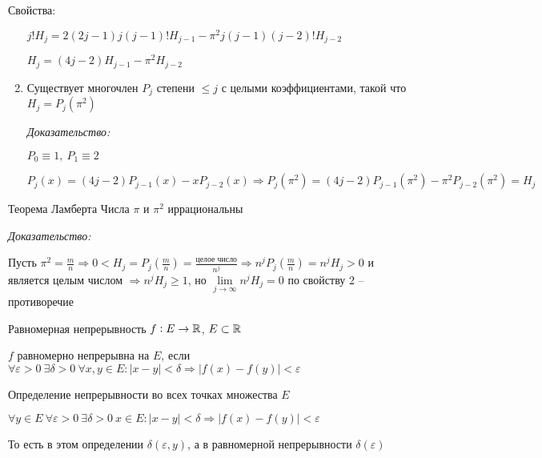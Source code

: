 \documentclass[12pt]{article}
\begin{document}
\begin{Example}{}
\begin{theo}{Свойства:}
\begin{enumerate}
            $j!H_j = 2(2j - 1)j(j - 1)!H_{j - 1} - \pi^2j(j - 1)(j - 2)!H_{j - 2}$

            $H_j = (4j - 2)H_{j - 1} - \pi^2H_{j - 2}$

            \item Существует многочлен $P_j$ степени $\leq j$ с целыми коэффициентами, такой что $H_j = P_j(\pi^2)$
            
            \textit{Доказательство:}

            $P_0 \equiv 1,\ P_1 \equiv 2$

            $P_j(x) = (4j - 2)P_{j - 1}(x) - xP_{j - 2}(x) \Rightarrow P_j(\pi^2) = (4j - 2)P_{j - 1}(\pi^2) - \pi^2P_{j - 2}(\pi^2) = H_j$
        \end{enumerate}
    \end{theo}
\end{Example}

\begin{theo}{Теорема Ламберта}
    Числа $\pi$ и $\pi^2$ иррациональны
\end{theo}

\textit{Доказательство:}

Пусть $\pi^2 = \frac{m}{n} \Rightarrow 0 < H_j = P_j(\frac{m}{n}) = \frac{\text{целое число}}{n^j} \Rightarrow n^jP_j(\frac{m}{n}) = n^jH_j > 0$ и является целым числом $\Rightarrow n^jH_j \geq 1$, но $\lim\limits_{j \to \infty} n^jH_j = 0$ по свойству 2 -- противоречие

\begin{defin}{Равномерная непрерывность}
    $f : E \rightarrow \mathbb R$, $E \subset \mathbb R$

    $f$ равномерно непрерывна на $E$, если $\forall \varepsilon > 0\ \exists \delta > 0\ \forall x, y \in E : |x - y| < \delta \Rightarrow |f(x) - f(y)| < \varepsilon$
\end{defin}

\begin{Remark}{}
    Определение непрерывности во всех точках множества $E$

    $\forall y \in E\ \forall \varepsilon > 0\ \exists \delta > 0\ x \in E : |x - y| < \delta \Rightarrow |f(x) - f(y)| < \varepsilon$

    То есть в этом определении $\delta(\varepsilon, y)$, а в равномерной непрерывности $\delta(\varepsilon)$
\end{Remark}
\end{document}

